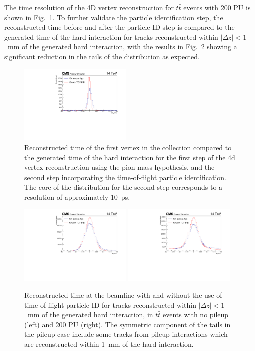 The time resolution of the 4D vertex reconstruction for $t\bar t$ events with 200 PU is shown in Fig.~\ref{fig:vtxdtgen}.  To further validate the particle identification step, the reconstructed time before and after the particle ID step is compared to the generated time of the hard interaction for tracks reconstructed within $|\Delta z|<1$~mm of the generated hard interaction, with the results in Fig.~\ref{fig:pidtres} showing a significant reduction in the tails of the distribution as expected.

\begin{figure}[!hbtp]
\centering
\includegraphics[width=0.48\textwidth]{fig/performance/4dvtx/ttbarpu200/dtvtxgen_pu200-2.pdf}
\caption{Reconstructed time of the first vertex in the collection compared to the generated time of the hard interaction for the first step of the 4d vertex reconstruction using the pion mass hypothesis, and the second step incorporating the time-of-flight particle identification.  The core of the distribution for the second step corresponds to a resolution of approximately 10~ps.}
\label{fig:vtxdtgen}
\end{figure}

\begin{figure}[!hbtp]
\centering
\includegraphics[width=0.48\textwidth]{fig/performance/4dvtx/ttbarnopu/dttrkgen_nopu-2.pdf}
\includegraphics[width=0.48\textwidth]{fig/performance/4dvtx/ttbarpu200/dttrkgen_pu200-2.pdf}
\caption{Reconstructed time at the beamline with and without the use of time-of-flight particle ID for tracks reconstructed within $|\Delta z|<1$~mm of the generated hard interaction, in $t\bar t$ events with no pileup (left) and 200 PU (right).  The symmetric component of the tails in the pileup case include some tracks from pileup interactions which are reconstructed within 1~mm of the hard interaction.}
\label{fig:pidtres}
\end{figure}
